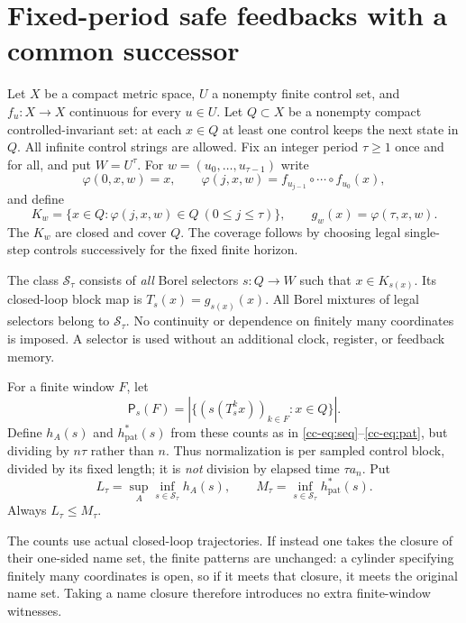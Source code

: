 \documentclass[11pt,reqno]{amsart}
\numberwithin{equation}{section}
\theoremstyle{definition}
\newcommand{\Patt}{\mathsf P}
\newcommand{\hpat}{h_{\mathrm{pat}}^{*}}
\newcommand{\Ssafe}{\mathcal S}
\begin{document}
\section{Fixed-period safe feedbacks with a common successor}

Let $X$ be a compact metric space, $U$ a nonempty finite control set, and
$f_u:X\to X$ continuous for every $u\in U$. Let $Q\subset X$ be a
nonempty compact controlled-invariant set: at each $x\in Q$ at least
one control keeps the next state in $Q$. All infinite control strings
are allowed. Fix an integer period $\tau\ge1$ once and for all, and put
$W=U^\tau$. For $w=(u_0,\ldots,u_{\tau-1})$ write
\[
 \varphi(0,x,w)=x,\qquad
 \varphi(j,x,w)=f_{u_{j-1}}\circ\cdots\circ f_{u_0}(x),
\]
and define
\begin{equation}\label{cc-eq:safe}
 K_w=\{x\in Q:\varphi(j,x,w)\in Q\ (0\le j\le\tau)\},
 \qquad g_w(x)=\varphi(\tau,x,w).
\end{equation}
The $K_w$ are closed and cover $Q$. The coverage follows by choosing
legal single-step controls successively for the fixed finite horizon.

The class $\Ssafe_\tau$ consists of \emph{all} Borel selectors $s:Q\to W$
such that $x\in K_{s(x)}$. Its closed-loop block map is
$T_s(x)=g_{s(x)}(x)$. All Borel mixtures of legal selectors belong to
$\Ssafe_\tau$. No continuity or dependence on finitely many coordinates
is imposed. A selector is used without an additional clock, register,
or feedback memory.

For a finite window $F$, let
\[
 \Patt_s(F)=\left|\{(s(T_s^k x))_{k\in F}:x\in Q\}\right|.
\]
Define $h_A(s)$ and $\hpat(s)$ from these counts as in
\eqref{cc-eq:seq}--\eqref{cc-eq:pat}, but dividing by $n\tau$ rather than
$n$. Thus normalization is per sampled control block, divided by its
fixed length; it is \emph{not} division by elapsed time $\tau a_n$.
Put
\begin{equation}\label{cc-eq:LM}
 L_\tau=\sup_A\inf_{s\in\Ssafe_\tau}h_A(s),\qquad
 M_\tau=\inf_{s\in\Ssafe_\tau}\hpat(s).
\end{equation}
Always $L_\tau\le M_\tau$.

The counts use actual closed-loop trajectories. If instead one takes
the closure of their one-sided name set, the finite patterns are
unchanged: a cylinder specifying finitely many coordinates is open, so
if it meets that closure, it meets the original name set. Taking a name
closure therefore introduces no extra finite-window witnesses.
\end{document}
